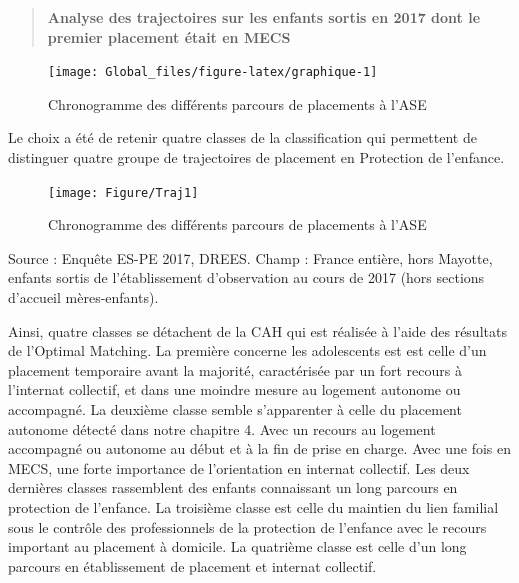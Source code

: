 \documentclass[
  12,
  a4paper,
]{report}
\begin{document}
\begin{quote}
\textbf{Analyse des trajectoires sur les enfants sortis en 2017 dont le
premier placement était en MECS}
\end{quote}

\begin{figure}[H]

{\centering \texttt{[image: Global\_files/figure-latex/graphique-1]} 

}

\caption{Chronogramme des différents parcours de placements à l'ASE}\label{fig:graphique}
\end{figure}

Le choix a été de retenir quatre classes de la classification qui
permettent de distinguer quatre groupe de trajectoires de placement en
Protection de l'enfance.

\begin{figure}[H]

{\centering \texttt{[image: Figure/Traj1]} 

}

\caption{Chronogramme des différents parcours de placements à l'ASE}\label{fig:unnamed-chunk-38}
\end{figure}
\begin{flushright}
\small{Source : Enquête ES-PE 2017, DREES.
Champ : France entière, hors Mayotte, enfants sortis de l’établissement d’observation au cours de 2017 (hors sections d’accueil mères-enfants).}
\end{flushright}

Ainsi, quatre classes se détachent de la CAH qui est réalisée à l'aide
des résultats de l'Optimal Matching. La première concerne les
adolescents est est celle d'un placement temporaire avant la majorité,
caractérisée par un fort recours à l'internat collectif, et dans une
moindre mesure au logement autonome ou accompagné. La deuxième classe
semble s'apparenter à celle du placement autonome détecté dans notre
chapitre 4. Avec un recours au logement accompagné ou autonome au début
et à la fin de prise en charge. Avec une fois en MECS, une forte
importance de l'orientation en internat collectif. Les deux dernières
classes rassemblent des enfants connaissant un long parcours en
protection de l'enfance. La troisième classe est celle du maintien du
lien familial sous le contrôle des professionnels de la protection de
l'enfance avec le recours important au placement à domicile. La
quatrième classe est celle d'un long parcours en établissement de
placement et internat collectif.
\end{document}

